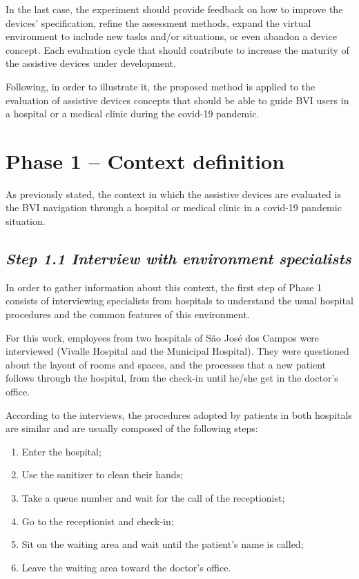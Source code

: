 In the last case, the experiment should provide feedback on how to improve the devices’ specification, refine the assessment methods, expand the virtual environment to include new tasks and/or situations, or even abandon a device concept. Each evaluation cycle that should contribute to increase the maturity of the assistive devices under development.

Following, in order to illustrate it, the proposed method is applied to the evaluation of assistive devices concepts that should be able to guide BVI users in a hospital or a medical clinic during the covid-19 pandemic.

\section{Phase 1 – Context definition}
\label{sec:interviews_phase}
    As previously stated, the context in which the assistive devices are evaluated is the BVI navigation through a hospital or medical clinic in a covid-19 pandemic situation. 

    \subsection*{\textit{Step 1.1 Interview with environment specialists}}
    
        In order to gather information about this context, the first step of Phase 1 consists of interviewing specialists from hospitals to understand the usual hospital procedures and the common features of this environment.
        
        For this work, employees from two hospitals of São José dos Campos were interviewed (Vivalle Hospital and the Municipal Hospital). They were questioned about the layout of rooms and spaces, and the processes that a new patient follows through the hospital, from the check-in until he/she get in the doctor’s office. 

        According to the interviews, the procedures adopted by patients in both hospitals are similar and are usually composed of the following steps:

        \begin{enumerate}
            \item Enter the hospital;
            \item Use the sanitizer to clean their hands;
            \item Take a queue number and wait for the call of the receptionist;
            \item Go to the receptionist and check-in;
            \item Sit on the waiting area and wait until the patient’s name is called;
            \item Leave the waiting area toward the doctor's office.            
        \end{enumerate}


